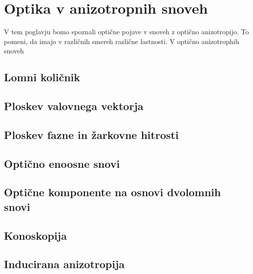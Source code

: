 
\chapter{Optika v anizotropnih snoveh}
\label{chap:AnizotropneSnovi}
V tem poglavju bomo spoznali optične pojave v snoveh z optično anizotropijo. To
pomeni, da imajo v različnih smereh različne lastnosti. V optično anizotrophih
snoveh


\section{Lomni količnik}
\section{Ploskev valovnega vektorja}
\section{Ploskev fazne in žarkovne hitrosti}
\section{Optično enoosne snovi}
\section{Optične komponente na osnovi dvolomnih snovi}
\section{Konoskopija}
\section{Inducirana anizotropija}
